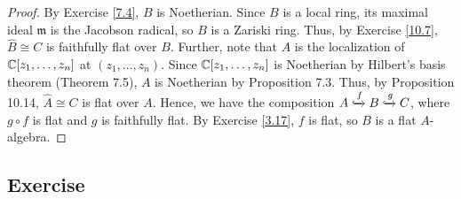 \begin{proof}
By Exercise \ref{7.4}, $B$ is Noetherian. Since $B$ is a local ring, its maximal ideal $\mathfrak{m}$ is the Jacobson radical,
so $B$ is a Zariski ring. Thus, by Exercise \ref{10.7}, $\hat B \cong C$ is faithfully flat over $B$. Further, note that $A$ is the 
localization of $\mathbb{C}[z_1,\ldots,z_n]$ at $(z_1,\ldots,z_n)$. Since $\mathbb{C}[z_1,\ldots,z_n]$ is Noetherian by Hilbert's basis theorem
(Theorem 7.5), $A$ is Noetherian by Proposition 7.3. Thus, by Proposition 10.14, $\hat A \cong C$ is flat over $A$. Hence, we have
the composition $A \xhookrightarrow{f} B \xhookrightarrow{g} C$,
where $g \circ f$ is flat and $g$ is faithfully flat. By Exercise \ref{3.17}, $f$ is flat, so $B$ is a flat $A$-algebra.
\end{proof}

\subsection{Exercise}\label{10.9}

